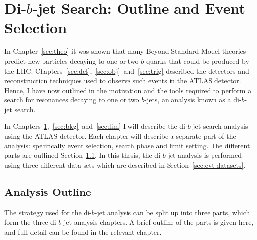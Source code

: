 \chapter{Di-$b$-jet Search: Outline and Event Selection}
\label{sec:evt}

In Chapter~\ref{sec:theo} it was shown that many Beyond Standard Model theories
predict new particles decaying to one or two $b$-quarks that could be produced by the LHC.
Chapters~\ref{sec:det},~\ref{sec:obj}~and~\ref{sec:trig}
described the detectors and reconstruction techniques used to observe such events in the ATLAS detector.
Hence, I have now outlined in the motivation and the tools required to perform
a search for resonances decaying to one or two $b$-jets,
an analysis known as a di-$b$-jet search.

In Chapters~\ref{sec:evt},~\ref{sec:bkg}~and~\ref{sec:lim}
I will describe the di-$b$-jet search analysis using the ATLAS detector.
Each chapter will describe a separate part of the analysis:
specifically event selection, search phase and limit setting.
The different parts are outlined Section~\ref{sec:evt-outline}.
In this thesis, the di-$b$-jet analysis is performed using three different data-sets
which are described in Section~\ref{sec:evt-datasets}.

\vspace{-1em}
\section{Analysis Outline}
\label{sec:evt-outline}

The strategy used for the di-$b$-jet analysis
can be split up into three parts,
which form the three di-$b$-jet analysis chapters.
A brief outline of the parts is given here,
and full detail can be found in the relevant chapter.


